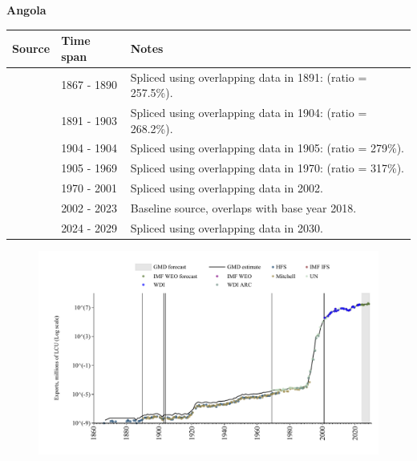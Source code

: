 \documentclass[12pt,a4paper,landscape]{article}
\begin{document}
\begin{adjustbox}{max totalsize={\paperwidth}{\paperheight},center}
\begin{minipage}[t][\textheight][t]{\textwidth}
\vspace*{0.5cm}
{}
\begin{center}
{\Large\bfseries Angola}
\end{center}
\vspace{0.5cm}
\begin{table}[H]
\centering
\small
\begin{tabular}{|l|l|l|}
\hline
\textbf{Source} & \textbf{Time span} & \textbf{Notes} \\
\hline
\rowcolor{white}\cite{HFS}& 1867 - 1890 &Spliced using overlapping data in 1891: (ratio = 257.5\%).\\
\rowcolor{lightgray}\cite{Mitchell}& 1891 - 1903 &Spliced using overlapping data in 1904: (ratio = 268.2\%).\\
\rowcolor{white}\cite{HFS}& 1904 - 1904 &Spliced using overlapping data in 1905: (ratio = 279\%).\\
\rowcolor{lightgray}\cite{Mitchell}& 1905 - 1969 &Spliced using overlapping data in 1970: (ratio = 317\%).\\
\rowcolor{white}\cite{UN}& 1970 - 2001 &Spliced using overlapping data in 2002.\\
\rowcolor{lightgray}\cite{WDI}& 2002 - 2023 &Baseline source, overlaps with base year 2018.\\
\rowcolor{white}\cite{IMF_WEO_forecast}& 2024 - 2029 &Spliced using overlapping data in 2030.\\
\hline
\end{tabular}
\end{table}
\begin{figure}[H]
\centering
\includegraphics[width=\textwidth,height=0.6\textheight,keepaspectratio]{graphs/AGO_exports.pdf}
\end{figure}
\end{minipage}
\end{adjustbox}
\end{document}
